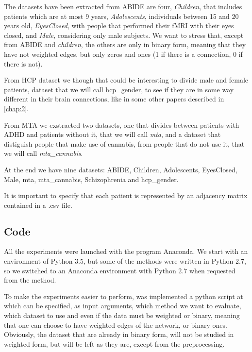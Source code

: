 The datasets have been extracted from ABIDE are four, \textit{Children}, that includes patients which are at most 9 years, \textit{Adolescents}, individuals between 15 and 20 years old, \textit{EyesClosed}, with people that performed their fMRI with their eyes closed, and \textit{Male}, considering only male subjects. We want to stress that, except from ABIDE and \textit{children}, the others are only in binary form, meaning that they have not weighted edges, but only zeros and ones (1 if there is a connection, 0 if there is not).
\vspace{0.5cm}

From HCP dataset we though that could be interesting to divide male and female patients, dataset that we will call hcp\_gender, to see if they are in some way different in their brain connections, like in some other papers described in \ref{chap:2}. 
\vspace{0.5cm}

From MTA we exstracted two datasets, one that divides between patients with ADHD and patients without it, that we will call \textit{mta}, and a dataset that distiguish people that make use of cannabis, from people that do not use it, that we will call \textit{mta\_cannabis}.
\vspace{0.5cm}

At the end we have nine datasets: ABIDE, Children, Adolescents, EyesClosed, Male, mta, mta\_cannabis, Schizophrenia and hcp\_gender. 
\vspace{0.5cm}

It is important to specify that each patient is represented by an adjacency matrix contained in a .csv file.

\subsection{Code}
All the experiments were launched with the program Anaconda. We start with an environment of Python 3.5, but some of the methods were written in Python 2.7, so we switched to an Anaconda environment with Python 2.7 when requested from the method.
\vspace{0.5cm}

To make the experiments easier to perform, was implemented a python script at which can be specified, as input arguments, which method we want to evaluate, which dataset to use and even if the data must be weighted or binary, meaning that one can choose to have weighted edges of the network, or binary ones. Obviously, the dataset that are already in binary form, will not be studied in weighted form, but will be left as they are, except from the preprocessing.
\vspace{0.5cm}

